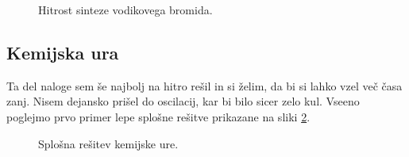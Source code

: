 \documentclass[a4paper]{article}
\begin{document}
\begin{figure}[H]
    \centering
    \caption{Hitrost sinteze vodikovega bromida.}
    \label{fig:br-heatmap}
\end{figure}

\subsection{Kemijska ura}
Ta del naloge sem še najbolj na hitro rešil in si želim, da bi si lahko vzel več časa zanj. 
Nisem dejansko prišel do oscilacij, kar bi bilo sicer zelo kul. Vseeno poglejmo prvo primer 
lepe splošne rešitve prikazane na sliki \ref{fig:clock-basic}. 

\begin{figure}[H]
    \centering
    \caption{Splošna rešitev kemijske ure.}
    \label{fig:clock-basic}
\end{figure}
\end{document}
